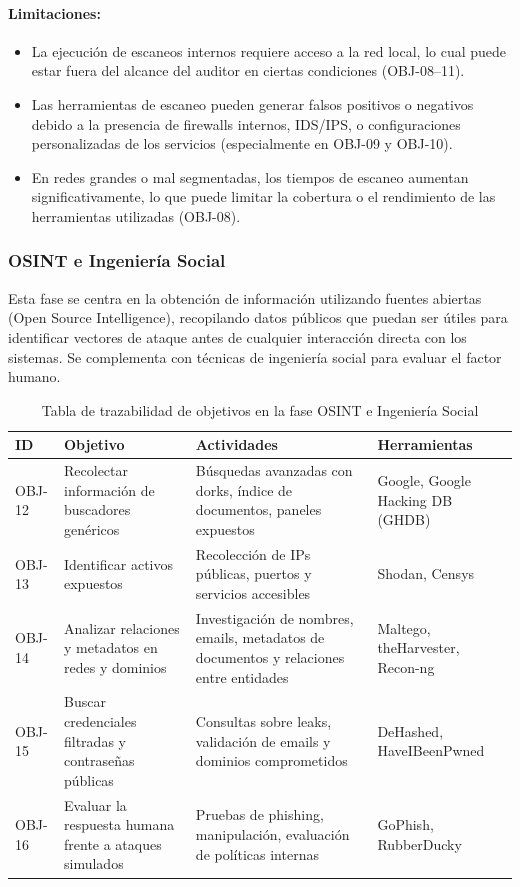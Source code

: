 \documentclass[a4paper, 10pt]{article}
\begin{document}
\paragraph{Limitaciones:}
\begin{itemize}
    \item La ejecución de escaneos internos requiere acceso a la red local, lo cual puede estar fuera del alcance del auditor en ciertas condiciones (OBJ-08–11).
    \item Las herramientas de escaneo pueden generar falsos positivos o negativos debido a la presencia de firewalls internos, IDS/IPS, o configuraciones personalizadas de los servicios (especialmente en OBJ-09 y OBJ-10).
    \item En redes grandes o mal segmentadas, los tiempos de escaneo aumentan significativamente, lo que puede limitar la cobertura o el rendimiento de las herramientas utilizadas (OBJ-08).
\end{itemize}
\clearpage

\subsubsection{OSINT e Ingeniería Social}

Esta fase se centra en la obtención de información utilizando fuentes abiertas (Open Source Intelligence), recopilando datos públicos que puedan ser útiles para identificar vectores de ataque antes de cualquier interacción directa con los sistemas. Se complementa con técnicas de ingeniería social para evaluar el factor humano.

\begin{table}[H]
\centering
\renewcommand{\arraystretch}{1.4}
    \begin{tabular}{|p{1.2cm}|p{3.9cm}|p{5.3cm}|p{4.2cm}|}
\hline
\textbf{ID} & \textbf{Objetivo} & \textbf{Actividades} & \textbf{Herramientas}  \\
\hline
OBJ-12 & Recolectar información de buscadores genéricos & Búsquedas avanzadas con dorks, índice de documentos, paneles expuestos & Google, Google Hacking DB (GHDB)  \\
\hline
OBJ-13 & Identificar activos expuestos & Recolección de IPs públicas, puertos y servicios accesibles & Shodan, Censys  \\
\hline
OBJ-14 & Analizar relaciones y metadatos en redes y dominios & Investigación de nombres, emails, metadatos de documentos y relaciones entre entidades & Maltego, theHarvester, Recon-ng  \\
\hline
OBJ-15 & Buscar credenciales filtradas y contraseñas públicas & Consultas sobre leaks, validación de emails y dominios comprometidos & DeHashed, HaveIBeenPwned  \\
\hline
OBJ-16 & Evaluar la respuesta humana frente a ataques simulados & Pruebas de phishing, manipulación, evaluación de políticas internas  & GoPhish, RubberDucky \\
\hline
\end{tabular}
\caption{Tabla de trazabilidad de objetivos en la fase OSINT e Ingeniería Social}
\end{table}
\end{document}
